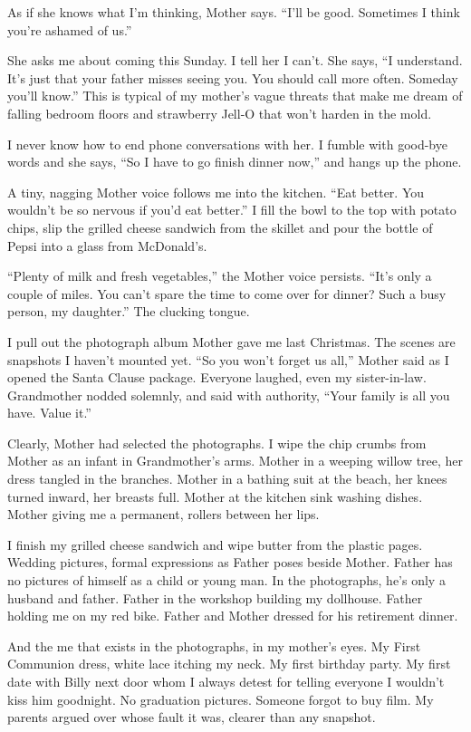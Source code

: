 \documentclass[twoside,10pt]{book}
\begin{document}
As if she knows what I'm thinking, Mother says. ``I'll be good.
Sometimes I think you're ashamed of us.''

She asks me about coming this Sunday. I tell her I can't. She says, ``I
understand. It's just that your father misses seeing you. You should
call more often. Someday you'll know.'' This is typical of my mother's
vague threats that make me dream of falling bedroom floors and
strawberry Jell-O that won't harden in the mold.

I never know how to end phone conversations with her. I fumble with
good-bye words and she says, ``So I have to go finish dinner now,'' and
hangs up the phone.

A tiny, nagging Mother voice follows me into the kitchen. ``Eat better.
You wouldn't be so nervous if you'd eat better.'' I fill the bowl to the
top with potato chips, slip the grilled cheese sandwich from the skillet
and pour the bottle of Pepsi into a glass from McDonald's.

``Plenty of milk and fresh vegetables,'' the Mother voice persists.
``It's only a couple of miles. You can't spare the time to come over for
dinner? Such a busy person, my daughter.'' The clucking tongue.

I pull out the photograph album Mother gave me last Christmas. The
scenes are snapshots I haven't mounted yet. ``So you won't forget us
all,'' Mother said as I opened the Santa Clause package. Everyone
laughed, even my sister-in-law. Grandmother nodded solemnly, and said
with authority, ``Your family is all you have. Value it.''

Clearly, Mother had selected the photographs. I wipe the chip crumbs
from Mother as an infant in Grandmother's arms. Mother in a weeping
willow tree, her dress tangled in the branches. Mother in a bathing suit
at the beach, her knees turned inward, her breasts full. Mother at the
kitchen sink washing dishes. Mother giving me a permanent, rollers
between her lips.

I finish my grilled cheese sandwich and wipe butter from the plastic
pages. Wedding pictures, formal expressions as Father poses beside
Mother. Father has no pictures of himself as a child or young man. In
the photographs, he's only a husband and father. Father in the workshop
building my dollhouse. Father holding me on my red bike. Father and
Mother dressed for his retirement dinner.

And the me that exists in the photographs, in my mother's eyes. My First
Communion dress, white lace itching my neck. My first birthday party. My
first date with Billy next door whom I always detest for telling
everyone I wouldn't kiss him goodnight. No graduation pictures. Someone
forgot to buy film. My parents argued over whose fault it was, clearer
than any snapshot.
\end{document}
